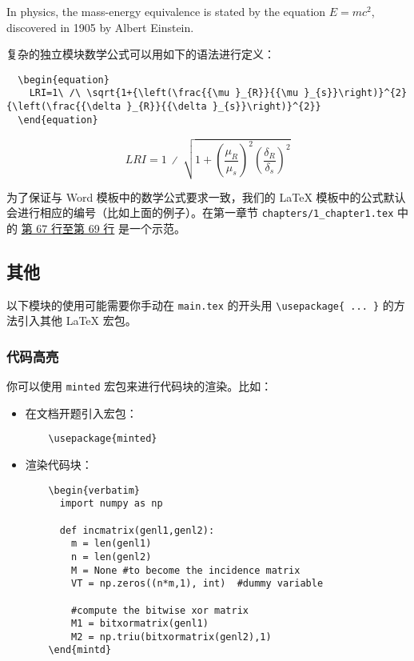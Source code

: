 In physics, the mass-energy equivalence is stated
by the equation $E=mc^2$, discovered in 1905 by Albert Einstein.

复杂的独立模块数学公式可以用如下的语法进行定义：

\begin{verbatim}
  \begin{equation}
    LRI=1\ ∕\ \sqrt{1+{\left(\frac{{\mu }_{R}}{{\mu }_{s}}\right)}^{2}{\left(\frac{{\delta }_{R}}{{\delta }_{s}}\right)}^{2}}
  \end{equation}
\end{verbatim}

\begin{equation}
  LRI=1\ ∕\ \sqrt{1+{\left(\frac{{\mu }_{R}}{{\mu }_{s}}\right)}^{2}{\left(\frac{{\delta }_{R}}{{\delta }_{s}}\right)}^{2}}
\end{equation}

为了保证与 Word 模板中的数学公式要求一致，我们的 {\LaTeX} 模板中的公式默认会进行相应的编号（比如上面的例子）。在第一章节 \texttt{chapters/1\_chapter1.tex} 中的 \href{https://github.com/spencerwooo/BIThesis/blob/master/graduation-thesis/chapters/1_chapter1.tex#L67-L69}{第 67 行至第 69 行} 是一个示范。

\subsection{其他}

以下模块的使用可能需要你手动在 \texttt{main.tex} 的开头用 \verb|\usepackage{ ... }| 的方法引入其他 {\LaTeX} 宏包。

\subsubsection{代码高亮}

你可以使用 \texttt{minted} 宏包来进行代码块的渲染。比如：

\begin{itemize}
  \item 在文档开题引入宏包：
        \begin{verbatim}
    \usepackage{minted}
  \end{verbatim}
  \item 渲染代码块：
        \begin{verbatim}
    \begin{verbatim}
      import numpy as np

      def incmatrix(genl1,genl2):
        m = len(genl1)
        n = len(genl2)
        M = None #to become the incidence matrix
        VT = np.zeros((n*m,1), int)  #dummy variable

        #compute the bitwise xor matrix
        M1 = bitxormatrix(genl1)
        M2 = np.triu(bitxormatrix(genl2),1)
    \end{mintd}
  \end{verbatim}
\end{itemize}

